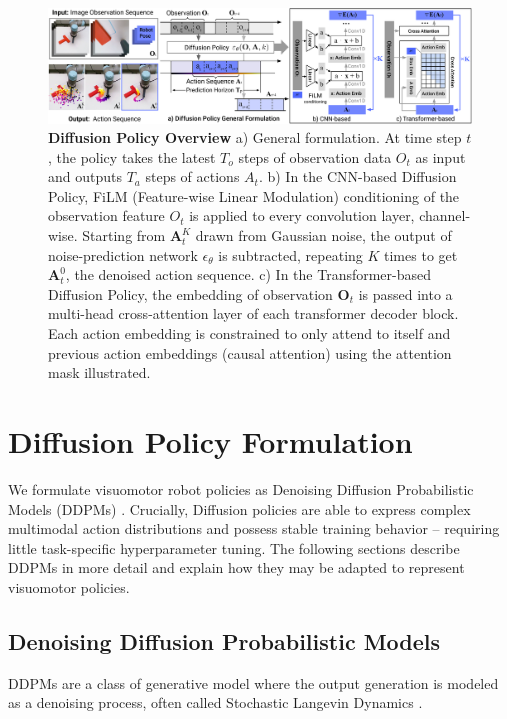 

\begin{figure}[t]
    \centering
    \includegraphics[width=\linewidth]{figure/policy_input_output.pdf}
    \caption{\textbf{Diffusion Policy Overview} \label{fig:policy_io} a) General formulation. At time step $t$, the policy takes the latest $T_o$ steps of observation data $O_t$ as input and outputs $T_a$ steps of actions $A_t$.  b) In the CNN-based Diffusion Policy, FiLM (Feature-wise Linear Modulation) \cite{perez2018film} conditioning of the observation feature $O_t$ is applied to every convolution layer, channel-wise. Starting from $\mathbf{A}^K_t$ drawn from Gaussian noise, the output of noise-prediction network $\epsilon_\theta$ is subtracted, repeating $K$ times to get $\mathbf{A}^0_t$, the denoised action sequence. c) In the Transformer-based \cite{vaswani2017attention} Diffusion Policy, the embedding of observation $\mathbf{O}_t$ is passed into a multi-head cross-attention layer of each transformer decoder block. Each action embedding is constrained to only attend to itself and previous action embeddings (causal attention) using the attention mask illustrated.  }
\end{figure}

\section{Diffusion Policy Formulation}
\label{sec:method}

We formulate visuomotor robot policies as Denoising Diffusion Probabilistic Models (DDPMs) \cite{ho2020denoising}. Crucially, Diffusion policies are able to express complex multimodal action distributions and possess stable training behavior -- requiring little task-specific hyperparameter tuning.
The following sections describe DDPMs in more detail and explain how they may be adapted to represent visuomotor policies.

\subsection{Denoising Diffusion Probabilistic Models}
\label{sec:ddpm}
DDPMs are a class of generative model where the output generation is modeled as a denoising process, often called Stochastic Langevin Dynamics \cite{welling2011bayesian}.

